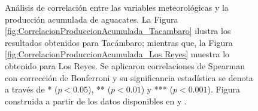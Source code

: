 \begin{figure}[ht]
\centering
{}
\hfill
{}
\caption{Análisis de correlación entre las variables meteorológicas y la producción acumulada de aguacates. La Figura \ref{fig:CorrelacionProduccionAcumulada_Tacambaro} ilustra los resultados obtenidos para Tacámbaro; mientras que, la Figura \ref{fig:CorrelacionProduccionAcumulada_Los Reyes} muestra lo obtenido para Los Reyes. Se aplicaron correlaciones de Spearman con corrección de Bonferroni y su significancia estadística se denota a través de * ($p<0.05$), ** ($p<0.01$) y *** ($p<0.001$). Figura construida a partir de los datos disponibles en \cite{AvanceSiembrasCosechas} y \cite{Rodriguez-Moreno_2021}.}
\label{fig:CorrelacionProduccionAcumulada}
\end{figure}




